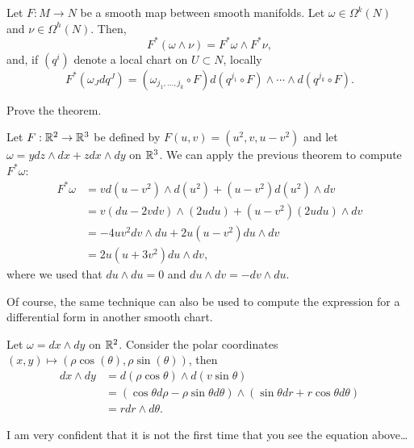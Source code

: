 \begin{theorem}\label{thm:pullbacksdifferentialforms}
  Let $F: M\to N$ be a smooth map between smooth manifolds.
  Let $\omega\in\Omega^k(N)$ and $\nu\in\Omega^h(N)$.
  Then,
  \begin{equation}
    F^*(\omega\wedge\nu) = F^*\omega \wedge F^*\nu,
  \end{equation}
  and, if $(q^i)$ denote a local chart on $U\subset N$, locally
  \begin{equation}
    F^*\left(\omega_J dq^J\right) = (\omega_{j_1,\ldots, j_k}\circ F) d(q^{j_1}\circ F)\wedge\cdots\wedge d(q^{j_k}\circ F).
  \end{equation}
\end{theorem}
\begin{exercise}
  Prove the theorem.
\end{exercise}

\begin{example}
  Let $F:\mathbb{R}^2\to\mathbb{R}^3$ be defined by $F(u,v) = (u^2,v,u-v^2)$ and let $\omega = y dz\wedge dx + z dx\wedge dy$ on $\mathbb{R}^3$.
  We can apply the previous theorem to compute $F^*\omega$:
  \begin{align}
    F^*\omega &= v d(u-v^2)\wedge d(u^2) + (u-v^2) d(u^2)\wedge dv \\
    &= v (du-2vdv)\wedge (2 u du) + (u-v^2) (2u du)\wedge dv\\
    &= -4uv^2 dv\wedge du + 2u(u-v^2) du\wedge dv \\
    &= 2u (u + 3v^2) du \wedge dv,
  \end{align}
  where we used that $du\wedge du =0$ and $du\wedge dv = -dv\wedge du$.
\end{example}

Of course, the same technique can also be used to compute the expression for a differential form in another smooth chart.

\begin{example}
  Let $\omega = dx\wedge dy$ on $\mathbb{R}^2$.
  Consider the polar coordinates $(x,y)\mapsto (\rho\cos(\theta),\rho\sin(\theta))$, then
  \begin{align}
    dx\wedge dy &= d(\rho\cos\theta)\wedge d(v\sin\theta) \\
    &= (\cos\theta d\rho -\rho\sin\theta d\theta)\wedge (\sin\theta dr + r\cos\theta d\theta) \\
    &= r dr\wedge d\theta.
  \end{align}

  I am very confident that it is not the first time that you see the equation above\ldots
\end{example}

